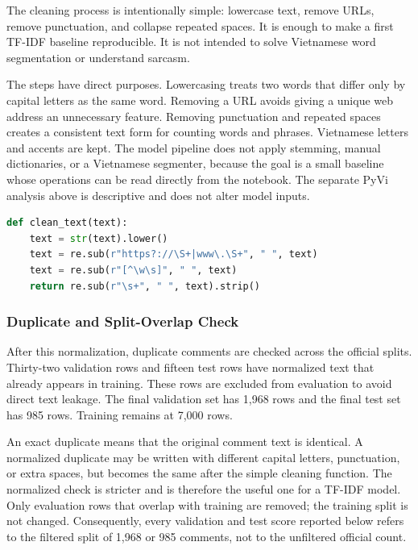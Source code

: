 \documentclass[oneside]{hcmut-report}
\begin{document}
The cleaning process is intentionally simple: lowercase text, remove URLs, remove punctuation, and collapse repeated spaces. It is enough to make a first TF-IDF baseline reproducible. It is not intended to solve Vietnamese word segmentation or understand sarcasm.

The steps have direct purposes. Lowercasing treats two words that differ only by capital letters as the same word. Removing a URL avoids giving a unique web address an unnecessary feature. Removing punctuation and repeated spaces creates a consistent text form for counting words and phrases. Vietnamese letters and accents are kept. The model pipeline does not apply stemming, manual dictionaries, or a Vietnamese segmenter, because the goal is a small baseline whose operations can be read directly from the notebook. The separate PyVi analysis above is descriptive and does not alter model inputs.

\begin{lstlisting}[language=Python,caption={Simple preprocessing used in the text notebook.}]
def clean_text(text):
    text = str(text).lower()
    text = re.sub(r"https?://\S+|www\.\S+", " ", text)
    text = re.sub(r"[^\w\s]", " ", text)
    return re.sub(r"\s+", " ", text).strip()
\end{lstlisting}

\subsubsection{Duplicate and Split-Overlap Check}

After this normalization, duplicate comments are checked across the official splits. Thirty-two validation rows and fifteen test rows have normalized text that already appears in training. These rows are excluded from evaluation to avoid direct text leakage. The final validation set has 1,968 rows and the final test set has 985 rows. Training remains at 7,000 rows.

An exact duplicate means that the original comment text is identical. A normalized duplicate may be written with different capital letters, punctuation, or extra spaces, but becomes the same after the simple cleaning function. The normalized check is stricter and is therefore the useful one for a TF-IDF model. Only evaluation rows that overlap with training are removed; the training split is not changed. Consequently, every validation and test score reported below refers to the filtered split of 1,968 or 985 comments, not to the unfiltered official count.
\end{document}
